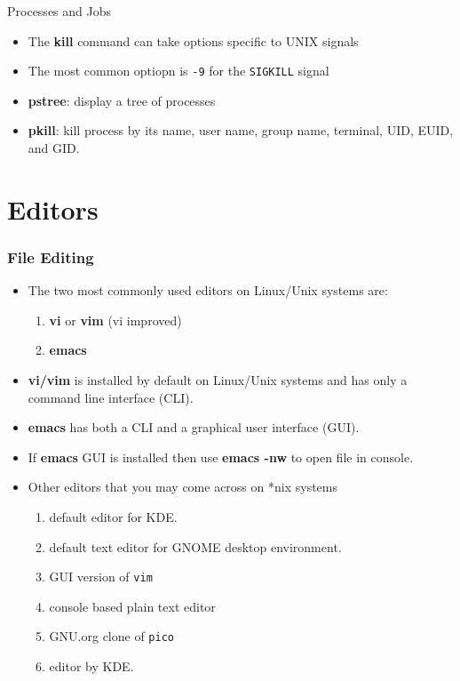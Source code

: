 \documentclass[slidestop,mathserif,compress,xcolor=svgnames]{beamer}
\newcommand*\vardiamond{\textcolor{tigerspurple}{%
  \ensuremath{\blacklozenge}}}
\newcommand*\enter{\tikz[baseline=-0.5ex] \draw[<-] (0,0) -| (0.5,0.1);}
\begin{document}
\begin{frame}[allowframebreaks]{\small Processes and Jobs}
\begin{itemize}
    \item The \textbf{kill} command can take options specific to UNIX signals
    \item The most common optiopn is \texttt{-9} for the \texttt{SIGKILL} signal
    \item \textbf{pstree}: display a tree of processes
    \item \textbf{pkill}: kill process by its name, user name, group name, terminal, UID, EUID, and GID.
  \end{itemize}
\end{frame}

\section{Editors}
\begin{frame}
  \frametitle{\small File Editing}
  \begin{itemize}
    \item The two most commonly used editors on Linux/Unix systems are:
    \begin{enumerate}
      \item \textbf{vi} or \textbf{vim} (vi improved)
      \item \textbf{emacs}
    \end{enumerate}
    \item \textbf{vi/vim} is installed by default on Linux/Unix systems and has only a command line interface (CLI).
    \item \textbf{emacs} has both a CLI and a graphical user interface (GUI).
    \item[$\vardiamond$] If \textbf{emacs} GUI is installed then use \textbf{emacs -nw} to open file in console.
    \item Other editors that you may come across on *nix systems
    \begin{enumerate}
      \item[kate:] {\scriptsize default editor for KDE.}
      \item[gedit:] {\scriptsize default text editor for GNOME desktop environment.}
      \item[gvim:] {\scriptsize GUI version of }\texttt{vim}
      \item[pico:] {\scriptsize console based plain text editor }
      \item[nano:] {\scriptsize GNU.org clone of }\texttt{pico}
      \item[kwrite:] {\scriptsize editor by KDE.}
    \end{enumerate}
  \end{itemize}
\end{frame}
\end{document}
